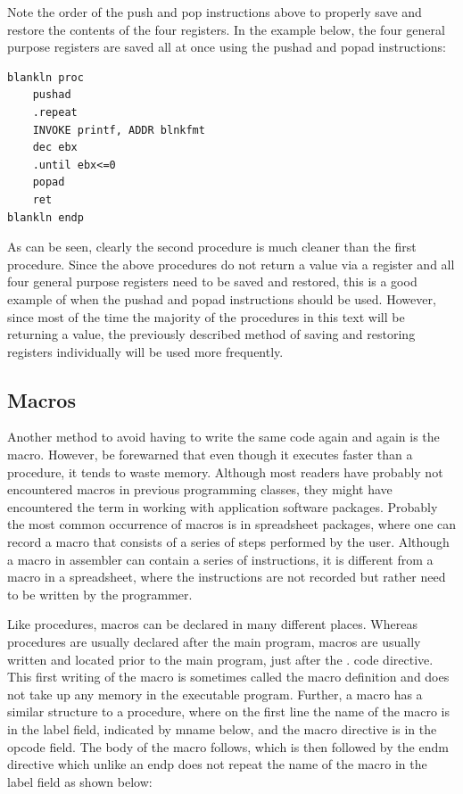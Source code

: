 \documentclass[10pt]{book}
\begin{document}
Note the order of the push and pop instructions above to properly save and restore the contents of the four registers. In the example below, the four general purpose registers are saved all at once using the pushad and popad instructions:

\begin{verbatim}
blankln proc
    pushad
    .repeat
    INVOKE printf, ADDR blnkfmt
    dec ebx
    .until ebx<=0
    popad
    ret
blankln endp
\end{verbatim}

As can be seen, clearly the second procedure is much cleaner than the first procedure. Since the above procedures do not return a value via a register and all four general purpose registers need to be saved and restored, this is a good example of when the pushad and popad instructions should be used. However, since most of the time the majority of the procedures in this text will be returning a value, the previously described method of saving and restoring registers individually will be used more frequently.

\subsection{Macros}
Another method to avoid having to write the same code again and again is the macro. However, be forewarned that even though it executes faster than a procedure, it tends to waste memory. Although most readers have probably not encountered macros in previous programming classes, they might have encountered the term in working with application software packages. Probably the most common occurrence of macros is in spreadsheet packages, where one can record a macro that consists of a series of steps performed by the user. Although a macro in assembler can contain a series of instructions, it is different from a macro in a spreadsheet, where the instructions are not recorded but rather need to be written by the programmer.

Like procedures, macros can be declared in many different places. Whereas procedures are usually declared after the main program, macros are usually written and located prior to the main program, just after the . code directive. This first writing of the macro is sometimes called the macro definition and does not take up any memory in the executable program. Further, a macro has a similar structure to a procedure, where on the first line the name of the macro is in the label field, indicated by mname below, and the macro directive is in the opcode field. The body of the macro follows, which is then followed by the endm directive which unlike an endp does not repeat the name of the macro in the label field as shown below:
\end{document}
